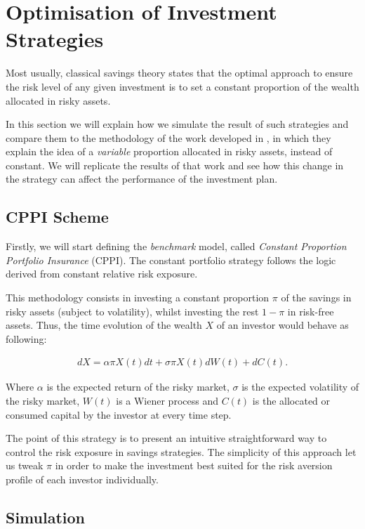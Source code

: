 \section{Optimisation of Investment Strategies}

Most usually, classical savings theory states that the optimal approach to ensure the risk level of any given investment is to set a constant proportion of the wealth allocated in risky assets.

In this section we will explain how we simulate the result of such strategies and compare them to the methodology of the work developed in \cite{a:guillen-optimisation}, in which they explain the idea of a \emph{variable} proportion allocated in risky assets, instead of constant. We will replicate the results of that work and see how this change in the strategy can affect the performance of the investment plan.

\subsection{CPPI Scheme}

Firstly, we will start defining the \textit{benchmark} model, called \textit{Constant Proportion Portfolio Insurance} (CPPI). The constant portfolio strategy follows the logic derived from constant relative risk exposure.

This methodology consists in investing a constant proportion $\pi$ of the savings in risky assets (subject to volatility), whilst investing the rest $1 - \pi$ in risk-free assets. Thus, the time evolution of the wealth $X$ of an investor would behave as following:

\begin{align}
	dX = \alpha \pi X(t)dt + \sigma \pi X(t)dW(t) + dC(t)\textit{.}
\end{align}

Where $\alpha$ is the expected return of the risky market, $\sigma$ is the expected volatility of the risky market, $W(t)$ is a Wiener process and $C(t)$ is the allocated or consumed capital by the investor at every time step.

The point of this strategy is to present an intuitive straightforward way to control the risk exposure in savings strategies. The simplicity of this approach let us tweak $\pi$ in order to make the investment best suited for the risk aversion profile of each investor individually.

\subsection*{Simulation}

